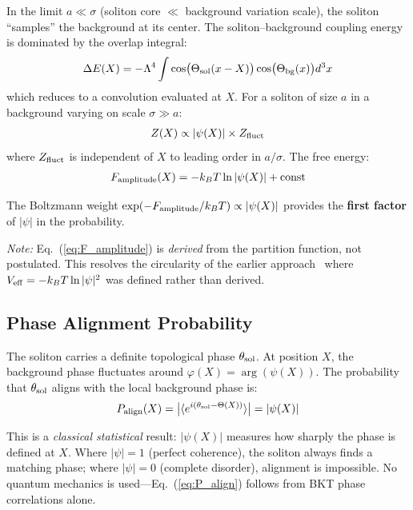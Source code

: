 ﻿\documentclass[twocolumn,showpacs,preprintnumbers,amsmath,amssymb,prd]{revtex4-2}
\begin{document}
In the limit $a \ll \sigma$ (soliton core $\ll$ background variation scale), the soliton ``samples'' the background at its center. The soliton--background coupling energy is dominated by the overlap integral:
\begin{align}
\Delta E(X) = -\Lambda^4 \int \cos\bigl(\Theta_{\rm sol}(x-X)\bigr) \cos\bigl(\Theta_{\rm bg}(x)\bigr) d^3x
\end{align}
which reduces to a convolution evaluated at $X$. For a soliton of size $a$ in a background varying on scale $\sigma \gg a$:
\begin{align}
Z(X) \propto |\psi(X)| \times Z_{\rm fluct}
\end{align}
where $Z_{\rm fluct}$ is independent of $X$ to leading order in $a/\sigma$. The free energy:
\begin{align}
F_{\rm amplitude}(X) = -k_BT \ln|\psi(X)| + \text{const}
\label{eq:F_amplitude}
\end{align}

The Boltzmann weight $\exp(-F_{\rm amplitude}/k_BT) \propto |\psi(X)|$ provides the \textbf{first factor} of $|\psi|$ in the probability.

\emph{Note:} Eq.~(\ref{eq:F_amplitude}) is \emph{derived} from the partition function, not postulated. This resolves the circularity of the earlier approach~\cite{Paper1} where $V_{\rm eff} = -k_BT \ln|\psi|^2$ was defined rather than derived.

\subsection{Phase Alignment Probability}

The soliton carries a definite topological phase $\theta_{\rm sol}$. At position $X$, the background phase fluctuates around $\varphi(X) = \arg(\psi(X))$. The probability that $\theta_{\rm sol}$ aligns with the local background phase is:
\begin{align}
P_{\rm align}(X) = \bigl|\langle e^{i(\theta_{\rm sol} - \Theta(X))}\rangle\bigr| = |\psi(X)|
\label{eq:P_align}
\end{align}

This is a \emph{classical statistical} result: $|\psi(X)|$ measures how sharply the phase is defined at $X$. Where $|\psi| = 1$ (perfect coherence), the soliton always finds a matching phase; where $|\psi| = 0$ (complete disorder), alignment is impossible. No quantum mechanics is used---Eq.~(\ref{eq:P_align}) follows from BKT phase correlations alone.
\end{document}
